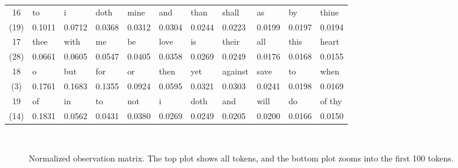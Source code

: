 \begin{table}[H]
\begin{tabular}{c||l|l|l|l|l|l|l|l|l|l}
		16 & to & i & doth & mine & and & than & shall & as & by & thine \\
		(19) & 0.1011 & 0.0712 & 0.0368 & 0.0312 & 0.0304 & 0.0244 & 0.0223 & 0.0199 & 0.0197 & 0.0194 \\ \hline
		17 & thee & with & me & be & love & is & their & all & this & heart \\
		(28) & 0.0661 & 0.0605 & 0.0547 & 0.0405 & 0.0358 & 0.0269 & 0.0249 & 0.0176 & 0.0168 & 0.0155 \\ \hline
		18 & o & but & for & or & then & yet & against & save & to & when \\
		(3) & 0.1761 & 0.1683 & 0.1355 & 0.0924 & 0.0595 & 0.0321 & 0.0303 & 0.0241 & 0.0198 & 0.0169 \\ \hline
		19 & of & in & to & not & i & doth & and & will & do & of thy \\
		(14) & 0.1831 & 0.0562 & 0.0431 & 0.0380 & 0.0269 & 0.0249 & 0.0205 & 0.0200 & 0.0166 & 0.0150 \\ \hline
	\end{tabular}
\end{table}

\begin{figure}[H]
	\centering
	 \\
	\caption{Normalized observation matrix. The top plot shows all tokens, and the bottom plot zooms into the first 100 tokens.}\label{fig:observation-matrix}
\end{figure}

